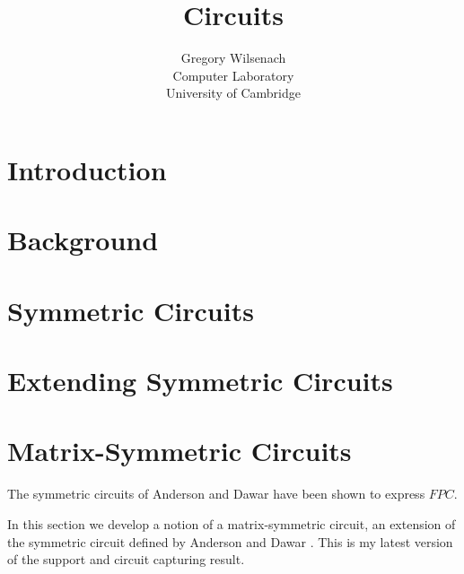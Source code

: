 \documentclass[12pt]{report}
\begin{document}
\nocite{*}

\title{Circuits}

\author{Gregory Wilsenach \\ 
Computer Laboratory \\
University of Cambridge}

\maketitle

\tableofcontents

\chapter{Introduction}

\chapter{Background}

\chapter{Symmetric Circuits}

\chapter{Extending Symmetric Circuits}

\chapter{Matrix-Symmetric Circuits}

The symmetric circuits of Anderson and Dawar \cite{} have been shown to express
$FPC$.

In this section we develop a notion of a matrix-symmetric circuit, an extension
of the symmetric circuit defined by Anderson and Dawar \cite{}. This is my
latest version of the support and circuit capturing result.

\section{}
\end{document}
